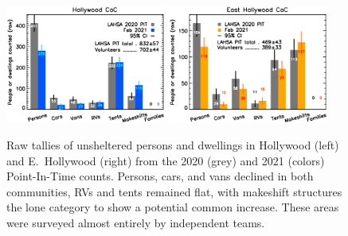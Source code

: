 \documentclass[11pt]{article}
\begin{document}
\begin{figure}[h]
	\centering
	\includegraphics[width = 0.47\textwidth, trim = 1cm 0cm 0cm 0cm]{Hwood2021Bars}
	\includegraphics[width = 0.47\textwidth, trim = 1cm 0cm 0cm 0cm]{Eho2021Bars}
	\caption{Raw tallies of unsheltered persons and dwellings in Hollywood (left) and E.~Hollywood
			(right) from the 2020 (grey) and 2021 (colors) Point-In-Time counts. Persons, cars, 
			and vans declined in both communities, RVs and tents remained flat, with makeshift 
			structures the lone category to show a potential common increase. 
			These areas were surveyed almost entirely by independent teams.}
	\label{fig:rawCounts}
\end{figure}
\end{document}

